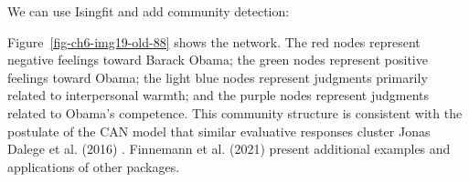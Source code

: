 \documentclass[
  a4paper,
  DIV=11,
  numbers=noendperiod]{scrreprt}
\newenvironment{Shaded}{\begin{snugshade}}{\end{snugshade}}
\newcommand{\AttributeTok}[1]{\textcolor[rgb]{0.40,0.45,0.13}{#1}}
\newcommand{\CommentTok}[1]{\textcolor[rgb]{0.37,0.37,0.37}{#1}}
\newcommand{\ConstantTok}[1]{\textcolor[rgb]{0.56,0.35,0.01}{#1}}
\newcommand{\DecValTok}[1]{\textcolor[rgb]{0.68,0.00,0.00}{#1}}
\newcommand{\FunctionTok}[1]{\textcolor[rgb]{0.28,0.35,0.67}{#1}}
\newcommand{\NormalTok}[1]{\textcolor[rgb]{0.00,0.23,0.31}{#1}}
\newcommand{\OtherTok}[1]{\textcolor[rgb]{0.00,0.23,0.31}{#1}}
\newcommand{\SpecialCharTok}[1]{\textcolor[rgb]{0.37,0.37,0.37}{#1}}
\newcommand{\StringTok}[1]{\textcolor[rgb]{0.13,0.47,0.30}{#1}}
\begin{document}
We can use Isingfit and add community detection:

\begin{Shaded}
\end{Shaded}

Figure~\ref{fig-ch6-img19-old-88} shows the network. The red nodes
represent negative feelings toward Barack Obama; the green nodes
represent positive feelings toward Obama; the light blue nodes represent
judgments primarily related to interpersonal warmth; and the purple
nodes represent judgments related to Obama's competence. This community
structure is consistent with the postulate of the CAN model that similar
evaluative responses cluster Jonas Dalege et al. (2016) . Finnemann et
al. (2021) present additional examples and applications of other
packages.
\end{document}
